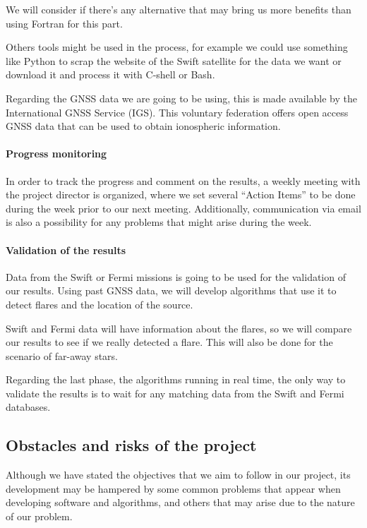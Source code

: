 We will consider if there’s any alternative that may bring us more benefits than using Fortran for this part. 

Others tools might be used in the process, for example we could use something like Python to scrap the website of the Swift satellite for the data we want or download it and process it with C-shell or Bash.

Regarding the GNSS data we are going to be using, this is made available by the  International GNSS Service (IGS). This voluntary federation offers open access GNSS data that can be used to obtain ionospheric information. \cite{hernandez2009igs}

\paragraph{Progress monitoring}

In order to track the progress and comment on the results, a weekly meeting with the project director is organized, where we set several “Action Items” to be done during the week prior to our next meeting. Additionally, communication via email is also a possibility for any problems that might arise during the week.

\paragraph{Validation of the results}

Data from the Swift or Fermi missions is going to be used for the validation of our results. Using past GNSS data, we will develop algorithms that use it to detect flares and the location of the source. 

Swift and Fermi data will have information about the flares, so we will compare our results to see if we really detected a flare. This will also be done for the scenario of far-away stars.

Regarding the last phase, the algorithms running in real time, the only way to validate the results is to wait for any matching data from the Swift and Fermi databases.

\subsection{Obstacles and risks of the project}

Although we have stated the objectives that we aim to follow in our project, its development may be hampered by some common problems that appear when developing software and algorithms, and others that may arise due to the nature of our problem.

